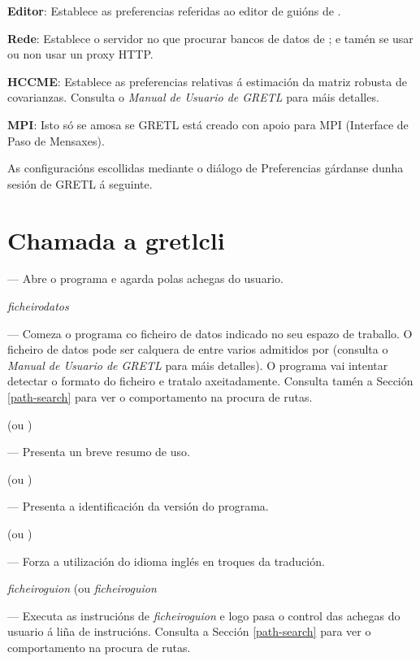 \textbf{Editor}: Establece as preferencias referidas ao editor de guións de
.

\textbf{Rede}: Establece o servidor no que procurar bancos de datos de
; e tamén se usar ou non usar un proxy HTTP.
      
\textbf{HCCME}: Establece as preferencias relativas á estimación da matriz
robusta de covarianzas. Consulta o \emph{Manual de Usuario de GRETL} para máis detalles.
      
\textbf{MPI}: Isto só se amosa se GRETL está creado con apoio para MPI
(Interface de Paso de Mensaxes).
      
As configuracións escollidas mediante o diálogo de Preferencias gárdanse
dunha sesión de GRETL á seguinte.
      
\section{Chamada a gretlcli}
\label{optarg2}


--- Abre o programa e agarda polas achegas do usuario.
      
 \textsl{ficheirodatos}

--- Comeza o programa co ficheiro de datos indicado no seu espazo de traballo.
O ficheiro de datos pode ser calquera de entre varios admitidos por
 (consulta o \emph{Manual de Usuario de GRETL} para máis detalles).
O programa vai intentar detectar o formato do ficheiro e tratalo axeitadamente.
Consulta tamén a Sección \ref{path-search} para ver o comportamento na procura de rutas.

 (ou )

--- Presenta un breve resumo de uso.

 (ou )

--- Presenta a identificación da versión do programa.

 (ou )

--- Forza a utilización do idioma inglés en troques da tradución.

 \textsl{ficheiroguion} (ou 
\textsl{ficheiroguion}

--- Executa as instrucións de \textsl{ficheiroguion} e logo pasa o control
das achegas do usuario á liña de instrucións. Consulta a Sección \ref{path-search}
para ver o comportamento na procura de rutas.


